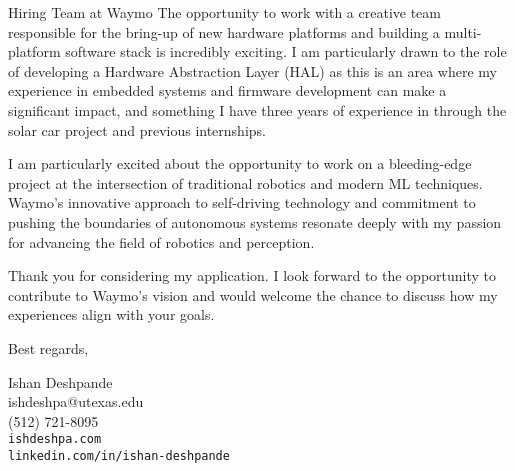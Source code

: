 \documentclass[a4paper,10pt]{letter}
\begin{document}
\begin{letter}{Hiring Team at Waymo}
The opportunity to work with a creative team responsible for the bring-up of new hardware platforms and building a multi-platform software stack is incredibly exciting. I am particularly drawn to the role of developing a Hardware Abstraction Layer (HAL) as this is an area where my experience in embedded systems and firmware development can make a significant impact, and something I have three years of experience in through the solar car project and previous internships.

I am particularly excited about the opportunity to work on a bleeding-edge project at the intersection of traditional robotics and modern ML techniques. Waymo's innovative approach to self-driving technology and commitment to pushing the boundaries of autonomous systems resonate deeply with my passion for advancing the field of robotics and perception.

Thank you for considering my application. I look forward to the opportunity to contribute to Waymo's vision and would welcome the chance to discuss how my experiences align with your goals.

Best regards,

Ishan Deshpande \\
ishdeshpa@utexas.edu \\
(512) 721-8095 \\
\texttt{ishdeshpa.com} \\
\texttt{linkedin.com/in/ishan-deshpande}

\end{letter}
\end{document}
